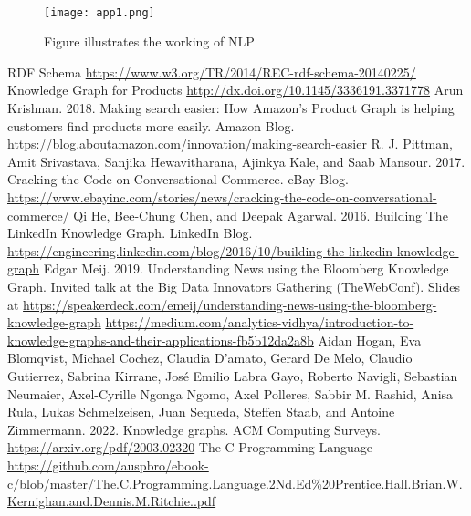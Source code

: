 \documentclass[conference]{IEEEtran}
\begin{document}
\\
\begin{figure}[htbp]
\centering
\texttt{[image: app1.png]} %
\caption{Figure illustrates the working of NLP}
\label{fig}
\end{figure}

\begin{thebibliography}{00}
 RDF Schema \url{https://www.w3.org/TR/2014/REC-rdf-schema-20140225/}
 Knowledge Graph for Products \url{http://dx.doi.org/10.1145/3336191.3371778}
 Arun Krishnan. 2018. Making search easier: How Amazon’s Product Graph is helping customers find products more easily. Amazon Blog. \url{https://blog.aboutamazon.com/innovation/making-search-easier}
 R. J. Pittman, Amit Srivastava, Sanjika Hewavitharana, Ajinkya Kale, and Saab Mansour. 2017. Cracking the Code on Conversational Commerce. eBay Blog. \url{https://www.ebayinc.com/stories/news/cracking-the-code-on-conversational-commerce/}
 Qi He, Bee-Chung Chen, and Deepak Agarwal. 2016. Building The LinkedIn Knowledge Graph. LinkedIn Blog. \url{https://engineering.linkedin.com/blog/2016/10/building-the-linkedin-knowledge-graph}
 Edgar Meij. 2019. Understanding News using the Bloomberg Knowledge Graph. Invited talk at the Big Data Innovators Gathering (TheWebConf). Slides at \url{https://speakerdeck.com/emeij/understanding-news-using-the-bloomberg-knowledge-graph}
 \url{https://medium.com/analytics-vidhya/introduction-to-knowledge-graphs-and-their-applications-fb5b12da2a8b}
 Aidan Hogan, Eva Blomqvist, Michael Cochez, Claudia D’amato, Gerard De Melo, Claudio Gutierrez, Sabrina Kirrane, José Emilio Labra Gayo, Roberto Navigli, Sebastian Neumaier, Axel-Cyrille Ngonga Ngomo, Axel Polleres, Sabbir M. Rashid, Anisa Rula, Lukas Schmelzeisen, Juan Sequeda, Steffen Staab, and Antoine Zimmermann. 2022. Knowledge graphs. ACM Computing Surveys. \url{https://arxiv.org/pdf/2003.02320}
 The C Programming Language \url{https://github.com/auspbro/ebook-c/blob/master/The.C.Programming.Language.2Nd.Ed%20Prentice.Hall.Brian.W.Kernighan.and.Dennis.M.Ritchie..pdf}
\end{thebibliography}
\end{document}
